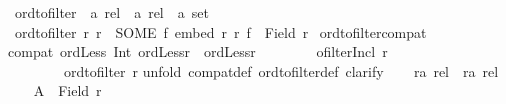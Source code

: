 \begin{isabellebody}
\ ord{\isacharunderscore}{\kern0pt}to{\isacharunderscore}{\kern0pt}filter\ {\isacharcolon}{\kern0pt}{\isacharcolon}{\kern0pt}\ {\isachardoublequoteopen}{\isacharprime}{\kern0pt}a\ rel\ {\isasymRightarrow}\ {\isacharprime}{\kern0pt}a\ rel\ {\isasymRightarrow}\ {\isacharprime}{\kern0pt}a\ set{\isachardoublequoteclose}\isanewline
{}\ {\isachardoublequoteopen}ord{\isacharunderscore}{\kern0pt}to{\isacharunderscore}{\kern0pt}filter\ r{}\ r\ {\isasymequiv}\ {\isacharparenleft}{\kern0pt}SOME\ f{\isachardot}{\kern0pt}\ embed\ r\ r{}\ f{\isacharparenright}{\kern0pt}\ {\isacharbackquote}{\kern0pt}\ {\isacharparenleft}{\kern0pt}Field\ r{\isacharparenright}{\kern0pt}{\isachardoublequoteclose}\isanewline
\isanewline
{}\isamarkupfalse%
\ ord{\isacharunderscore}{\kern0pt}to{\isacharunderscore}{\kern0pt}filter{\isacharunderscore}{\kern0pt}compat{\isacharcolon}{\kern0pt}\isanewline
{\isachardoublequoteopen}compat\ {\isacharparenleft}{\kern0pt}ordLess\ Int\ {\isacharparenleft}{\kern0pt}ordLess{\isasyminverse}{\isacharbackquote}{\kern0pt}{\isacharbackquote}{\kern0pt}{\isacharbraceleft}{\kern0pt}r{}{\isacharbraceright}{\kern0pt}\ {\isasymtimes}\ ordLess{\isasyminverse}{\isacharbackquote}{\kern0pt}{\isacharbackquote}{\kern0pt}{\isacharbraceleft}{\kern0pt}r{}{\isacharbraceright}{\kern0pt}{\isacharparenright}{\kern0pt}{\isacharparenright}{\kern0pt}\isanewline
\ \ \ \ \ \ \ \ {\isacharparenleft}{\kern0pt}ofilterIncl\ r{}{\isacharparenright}{\kern0pt}\isanewline
\ \ \ \ \ \ \ \ {\isacharparenleft}{\kern0pt}ord{\isacharunderscore}{\kern0pt}to{\isacharunderscore}{\kern0pt}filter\ r{}{\isacharparenright}{\kern0pt}{\isachardoublequoteclose}\isanewline
%
\isadelimproof
%
\endisadelimproof
%
\isatagproof
{}\isamarkupfalse%
{\isacharparenleft}{\kern0pt}unfold\ compat{\isacharunderscore}{\kern0pt}def\ ord{\isacharunderscore}{\kern0pt}to{\isacharunderscore}{\kern0pt}filter{\isacharunderscore}{\kern0pt}def{\isacharcomma}{\kern0pt}\ clarify{\isacharparenright}{\kern0pt}\isanewline
\ \ \isamarkupfalse%
\ r{}{\isacharcolon}{\kern0pt}{\isacharcolon}{\kern0pt}{\isachardoublequoteopen}{\isacharprime}{\kern0pt}a\ rel{\isachardoublequoteclose}\ \ r{}{\isacharcolon}{\kern0pt}{\isacharcolon}{\kern0pt}{\isachardoublequoteopen}{\isacharprime}{\kern0pt}a\ rel{\isachardoublequoteclose}\isanewline
\ \ \isamarkupfalse%
\ {\isacharquery}{\kern0pt}A{}\ {\isacharequal}{\kern0pt}\ {\isachardoublequoteopen}Field\ r{}{\isachardoublequoteclose}\ \ \isamarkupfalse%

\end{isabellebody}
